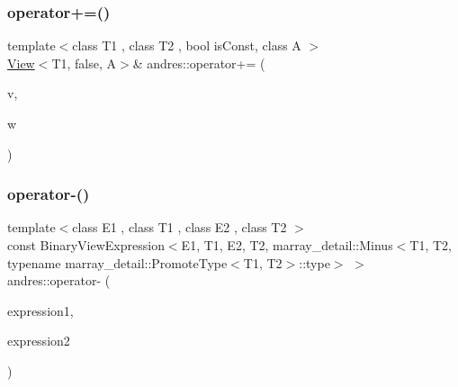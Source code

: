 \mbox{\label{namespaceandres_a8336b0a095fea76e6b28903e7c9dbe94}} 
\subsubsection{\texorpdfstring{operator+=()}{operator+=()}}
{\footnotesize\ttfamily template$<$class T1 , class T2 , bool is\+Const, class A $>$ \\
\hyperlink{classandres_1_1View}{View}$<$T1, false, A$>$\& andres\+::operator+= (\begin{DoxyParamCaption}\item[{\hyperlink{classandres_1_1View}{View}$<$ T1, false, A $>$ \&}]{v,  }\item[{const \hyperlink{classandres_1_1View}{View}$<$ T2, is\+Const, A $>$ \&}]{w }\end{DoxyParamCaption})\hspace{0.3cm}{\ttfamily [inline]}}

\mbox{\label{namespaceandres_a30eb13a41805ae01b38c7ebf35179743}} 
\subsubsection{\texorpdfstring{operator-\/()}{operator-()}\hspace{0.1cm}{\footnotesize\ttfamily [1/2]}}
{\footnotesize\ttfamily template$<$class E1 , class T1 , class E2 , class T2 $>$ \\
const Binary\+View\+Expression$<$E1, T1, E2, T2, marray\+\_\+detail\+::\+Minus$<$T1, T2, typename marray\+\_\+detail\+::\+Promote\+Type$<$T1, T2$>$\+::type$>$ $>$ andres\+::operator-\/ (\begin{DoxyParamCaption}\item[{const \hyperlink{classandres_1_1ViewExpression}{View\+Expression}$<$ E1, T1 $>$ \&}]{expression1,  }\item[{const \hyperlink{classandres_1_1ViewExpression}{View\+Expression}$<$ E2, T2 $>$ \&}]{expression2 }\end{DoxyParamCaption})\hspace{0.3cm}{\ttfamily [inline]}}

\mbox{\label{namespaceandres_a35120fff610c97905d02a9e358b14150}} 
